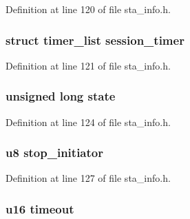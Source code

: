 Definition at line 120 of file sta\-\_\-info.\-h.

\hypertarget{structtid__ampdu__tx_a96b57b74220e5b5898ffd791809d9dfe}{
\subsubsection[{session\-\_\-timer}]{\setlength{\rightskip}{0pt plus 5cm}struct timer\-\_\-list session\-\_\-timer}}\label{structtid__ampdu__tx_a96b57b74220e5b5898ffd791809d9dfe}


Definition at line 121 of file sta\-\_\-info.\-h.

\hypertarget{structtid__ampdu__tx_af7504fc0e249186b115eb5f51a297878}{
\subsubsection[{state}]{\setlength{\rightskip}{0pt plus 5cm}unsigned long state}}\label{structtid__ampdu__tx_af7504fc0e249186b115eb5f51a297878}


Definition at line 124 of file sta\-\_\-info.\-h.

\hypertarget{structtid__ampdu__tx_a51e1b73c63d487e74b3c38bf47bc4d28}{
\subsubsection[{stop\-\_\-initiator}]{\setlength{\rightskip}{0pt plus 5cm}u8 stop\-\_\-initiator}}\label{structtid__ampdu__tx_a51e1b73c63d487e74b3c38bf47bc4d28}


Definition at line 127 of file sta\-\_\-info.\-h.

\hypertarget{structtid__ampdu__tx_a735bf6536b07682f96c9417b0f1e9079}{
\subsubsection[{timeout}]{\setlength{\rightskip}{0pt plus 5cm}u16 timeout}}\label{structtid__ampdu__tx_a735bf6536b07682f96c9417b0f1e9079}


